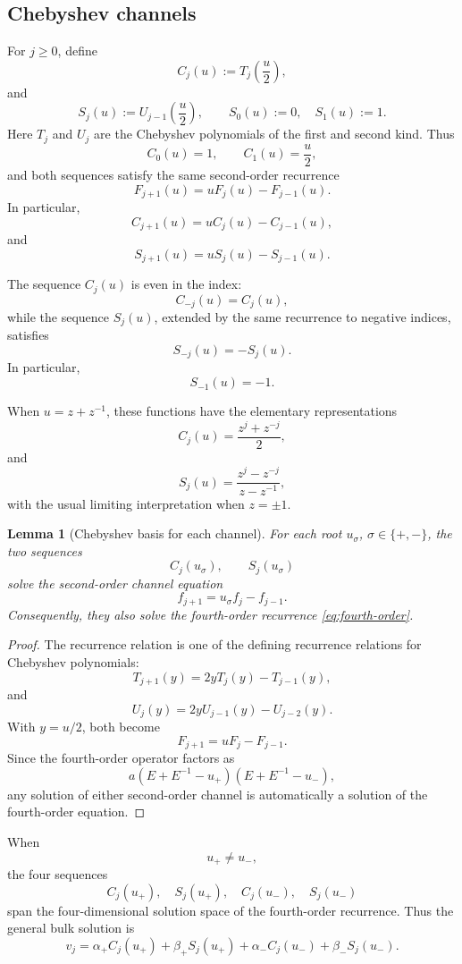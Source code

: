 \documentclass[11pt]{amsart}
\numberwithin{equation}{section}
\newtheorem{lemma}[theorem]{Lemma}
\begin{document}
\subsection{Chebyshev channels}

For \(j\ge0\), define
\[
        C_j(u):=T_j\!\left(\frac u2\right),
\]
and
\[
        S_j(u):=U_{j-1}\!\left(\frac u2\right),
        \qquad S_0(u):=0,\quad S_1(u):=1.
\]
Here \(T_j\) and \(U_j\) are the Chebyshev polynomials of the first and second
kind.  Thus
\[
        C_0(u)=1,
        \qquad
        C_1(u)=\frac u2,
\]
and both sequences satisfy the same second-order recurrence
\[
        F_{j+1}(u)=uF_j(u)-F_{j-1}(u).
\]
In particular,
\[
        C_{j+1}(u)=uC_j(u)-C_{j-1}(u),
\]
and
\[
        S_{j+1}(u)=uS_j(u)-S_{j-1}(u).
\]

The sequence \(C_j(u)\) is even in the index:
\[
        C_{-j}(u)=C_j(u),
\]
while the sequence \(S_j(u)\), extended by the same recurrence to negative
indices, satisfies
\[
        S_{-j}(u)=-S_j(u).
\]
In particular,
\[
        S_{-1}(u)=-1.
\]

When \(u=z+z^{-1}\), these functions have the elementary representations
\[
        C_j(u)=\frac{z^j+z^{-j}}2,
\]
and
\[
        S_j(u)=\frac{z^j-z^{-j}}{z-z^{-1}},
\]
with the usual limiting interpretation when \(z=\pm1\).

\begin{lemma}[Chebyshev basis for each channel]
For each root \(u_\sigma\), \(\sigma\in\{+,-\}\), the two sequences
\[
        C_j(u_\sigma),
        \qquad
        S_j(u_\sigma)
\]
solve the second-order channel equation
\[
        f_{j+1}=u_\sigma f_j-f_{j-1}.
\]
Consequently, they also solve the fourth-order recurrence
\eqref{eq:fourth-order}.
\end{lemma}

\begin{proof}
The recurrence relation is one of the defining recurrence relations for
Chebyshev polynomials:
\[
        T_{j+1}(y)=2yT_j(y)-T_{j-1}(y),
\]
and
\[
        U_j(y)=2yU_{j-1}(y)-U_{j-2}(y).
\]
With \(y=u/2\), both become
\[
        F_{j+1}=uF_j-F_{j-1}.
\]
Since the fourth-order operator factors as
\[
        a(E+E^{-1}-u_+)(E+E^{-1}-u_-),
\]
any solution of either second-order channel is automatically a solution of
the fourth-order equation.
\end{proof}

When
\[
        u_+\ne u_-,
\]
the four sequences
\[
        C_j(u_+),\quad S_j(u_+),\quad C_j(u_-),\quad S_j(u_-)
\]
span the four-dimensional solution space of the fourth-order recurrence.
Thus the general bulk solution is
\begin{equation}\label{eq:general-cheb-solution}
        v_j
        =
        \alpha_+ C_j(u_+)
        +\beta_+ S_j(u_+)
        +\alpha_- C_j(u_-)
        +\beta_- S_j(u_-).
\end{equation}
\end{document}
